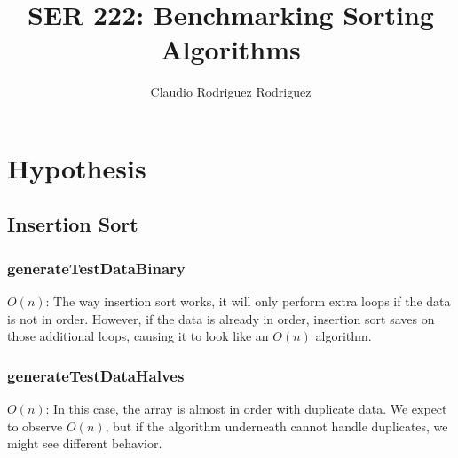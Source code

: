 \documentclass{article}
\begin{document}
\title{SER 222: Benchmarking Sorting Algorithms}
\author{Claudio Rodriguez Rodriguez}
\maketitle







\section{Hypothesis}

\subsection{Insertion Sort}

\subsubsection{generateTestDataBinary}

\textbf{$O(n)$}: The way insertion sort works, it will only perform extra loops if the data is not in order. However, if the data is already in order, insertion sort saves on those additional loops, causing it to look like an $O(n)$ algorithm. 

\subsubsection{generateTestDataHalves}

\textbf{$O(n)$}: In this case, the array is almost in order with duplicate data. We expect to observe $O(n)$, but if the algorithm underneath cannot handle duplicates, we might see different behavior. 
\end{document}
